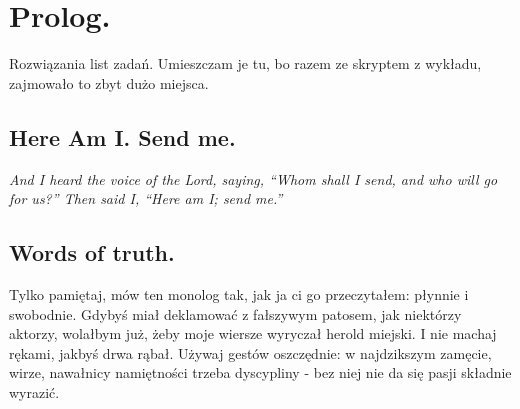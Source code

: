 \chapter*{Prolog.}
Rozwiązania list zadań. Umieszczam je tu, bo razem ze skryptem z wykładu, zajmowało to zbyt dużo miejsca.
\section*{Here Am I. Send me.}
\textit{And I heard the voice of the Lord, saying,
“Whom shall I send, and who will go for us?”
Then said I, “Here am I; send me.”} 

\section*{Words of truth.}
Tylko pamiętaj, mów ten monolog tak, jak ja ci go przeczytałem: płynnie i swobodnie. Gdybyś miał deklamować z fałszywym patosem, jak niektórzy aktorzy, wolałbym już, żeby moje wiersze wyryczał herold miejski. I nie machaj rękami, jakbyś drwa rąbał. Używaj gestów oszczędnie: w najdzikszym zamęcie, wirze, nawałnicy namiętności trzeba dyscypliny - bez niej nie da się pasji składnie wyrazić.

